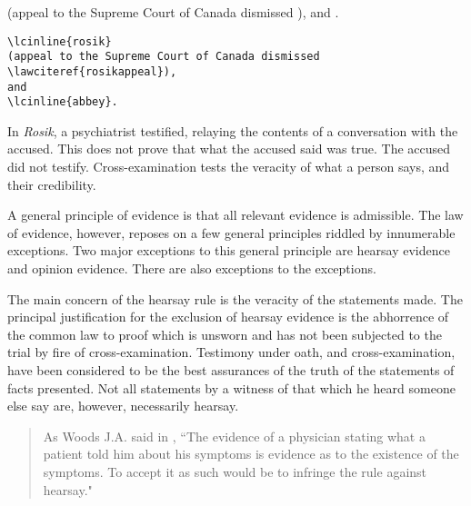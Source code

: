 (appeal to the Supreme Court of Canada dismissed 
),
and
.

\begin{magpar}
\begin{verbatim}
\lcinline{rosik}
(appeal to the Supreme Court of Canada dismissed 
\lawciteref{rosikappeal}),
and
\lcinline{abbey}.
\end{verbatim}
\end{magpar}
\begin{casenote}{}
In \textit{Rosik}, a psychiatrist testified, relaying the contents of a conversation with the accused. This does not prove that what the accused said was true. The accused did not testify. Cross-examination tests the veracity of what a person says, and their credibility. 
\end{casenote}
\begin{casequote}{}
A general principle of evidence is that all relevant evidence is admissible. The law of evidence, however, reposes on a few general principles riddled by innumerable exceptions. Two major exceptions to this general principle are hearsay evidence and opinion evidence. There are also exceptions to the exceptions. 
\end{casequote}


\begin{casequote}{}
The main concern of the hearsay rule is the veracity of the statements made. The principal justification for the exclusion of hearsay evidence is the abhorrence of the common law to proof which is unsworn and has not been subjected to the trial by fire of cross-examination. Testimony under oath, and cross-examination, have been considered to be the best assurances of the truth of the statements of facts presented. Not all statements by a witness of that which he heard someone else say are, however, necessarily hearsay.
\end{casequote}

\newpage
\begin{quotation}\noindent
As Woods J.A. said in , ``The evidence of a physician stating what a patient told him about his symptoms is  evidence as to the existence of the symptoms. To accept it as such would be to infringe the rule against hearsay."
\end{quotation}

